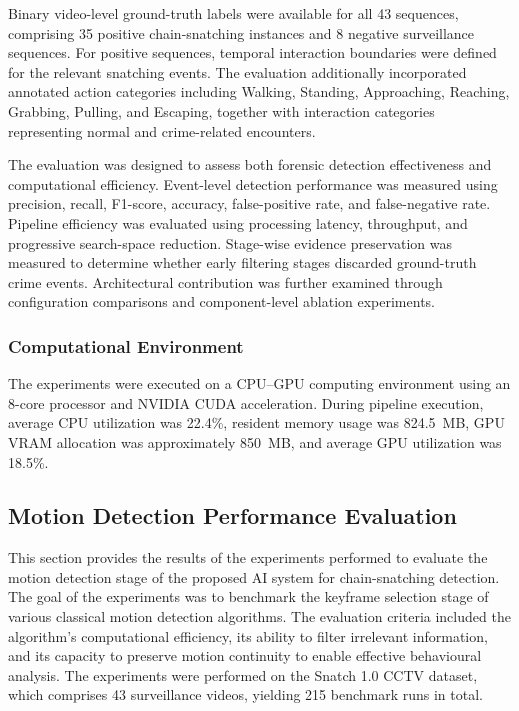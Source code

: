 \documentclass[conference]{IEEEtran}
\begin{document}
Binary video-level ground-truth labels were available for all 43
sequences, comprising 35 positive chain-snatching instances and 8
negative surveillance sequences. For positive sequences, temporal
interaction boundaries were defined for the relevant snatching events.
The evaluation additionally incorporated annotated action categories
including Walking, Standing, Approaching, Reaching, Grabbing, Pulling,
and Escaping, together with interaction categories representing normal
and crime-related encounters.

The evaluation was designed to assess both forensic detection
effectiveness and computational efficiency. Event-level detection
performance was measured using precision, recall, F1-score, accuracy,
false-positive rate, and false-negative rate. Pipeline efficiency was
evaluated using processing latency, throughput, and progressive
search-space reduction. Stage-wise evidence preservation was measured
to determine whether early filtering stages discarded ground-truth
crime events. Architectural contribution was further examined through
configuration comparisons and component-level ablation experiments.

\subsubsection{Computational Environment}

The experiments were executed on a CPU--GPU computing environment using
an 8-core processor and NVIDIA CUDA acceleration. During pipeline
execution, average CPU utilization was 22.4\%, resident memory usage
was 824.5~MB, GPU VRAM allocation was approximately 850~MB, and average
GPU utilization was 18.5\%.

\subsection{Motion Detection Performance Evaluation}
This section provides the results of the experiments performed to evaluate the motion detection stage of the proposed AI system for chain-snatching detection. The goal of the experiments was to benchmark the keyframe selection stage of various classical motion detection algorithms. The evaluation criteria included the algorithm’s computational efficiency, its ability to filter irrelevant information, and its capacity to preserve motion continuity to enable effective behavioural analysis. The experiments were performed on the Snatch 1.0 CCTV dataset, which comprises 43 surveillance videos, yielding 215 benchmark runs in total.
\end{document}
